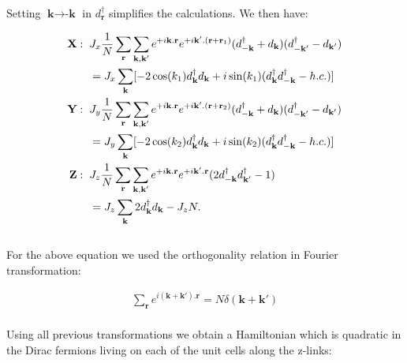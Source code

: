 \documentclass{article}
\begin{document}
\noindent Setting $\textbf{k} \rightarrow \textbf{-k}$ in $d^\dagger_\textbf{r}$ simplifies the calculations. We then have:

\begin{equation}\label{eq:14}
	\begin{aligned}
		\textbf{X}: \hspace{2mm} &J_x\frac{1}{N}\sum_\textbf{r}\sum_{\textbf{k},\textbf{k}'}e^{+i\textbf{k}.\textbf{r}}e^{+i\textbf{k}'.(\textbf{r}+\textbf{r}_1)}(d^\dagger_{-\textbf{k}} + d_{\textbf{k}})(d^\dagger_{-\textbf{k}'} - d_{\textbf{k}'})\\
		&= J_x\sum_{\textbf{k}} [-2\cos(k_1)d^\dagger_{\textbf{k}}d_{\textbf{k}} + i\sin(k_1)(d^\dagger_{\textbf{k}}d^\dagger_{-\textbf{k}}-h.c.)]\\
		\textbf{Y}: \hspace{2mm} &J_y\frac{1}{N}\sum_\textbf{r}\sum_{\textbf{k},\textbf{k}'}e^{+i\textbf{k}.\textbf{r}}e^{+i\textbf{k}'.(\textbf{r}+\textbf{r}_2)}(d^\dagger_{-\textbf{k}} + d_{\textbf{k}})(d^\dagger_{-\textbf{k}'} - d_{\textbf{k}'})\\
		&= J_y\sum_{\textbf{k}} [-2\cos(k_2)d^\dagger_{\textbf{k}}d_{\textbf{k}} + i\sin(k_2)(d^\dagger_{\textbf{k}}d^\dagger_{-\textbf{k}}-h.c.)]\\
		\textbf{Z}: \hspace{2mm} &J_z\frac{1}{N}\sum_\textbf{r}\sum_{\textbf{k},\textbf{k}'}e^{+i\textbf{k}.\textbf{r}}e^{+i\textbf{k}'.\textbf{r}}(2d^\dagger_{-\textbf{k}}d^\dagger_{\textbf{k}'}-1)\\
		&= J_z\sum_{\textbf{k}} 2d^\dagger_{\textbf{k}}d_{\textbf{k}}-J_zN.\\
	\end{aligned}
\end{equation}\\

\noindent For the above equation we used the orthogonality relation in Fourier transformation:

\begin{equation}\label{eq:15}
	\begin{aligned}
		\sum_\textbf{r} e^{i(\textbf{k}+\textbf{k}').\textbf{r}} = N\delta(\textbf{k} + \textbf{k}')
	\end{aligned}
\end{equation}\\

Using all previous transformations we obtain a Hamiltonian which is quadratic in the Dirac fermions living on each of the unit cells along the z-links:
\end{document}

